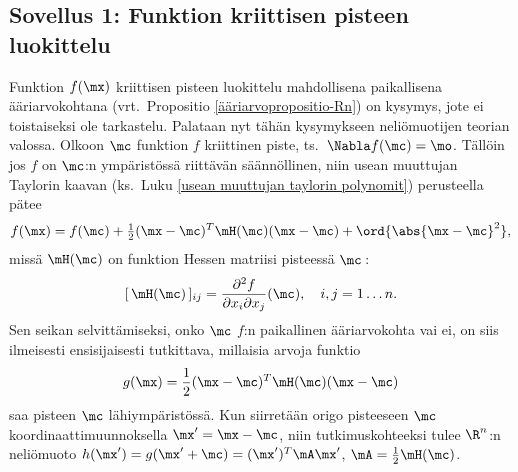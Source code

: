 \subsection{Sovellus 1: Funktion kriittisen pisteen luokittelu}

Funktion $f(\mx)$ kriittisen pisteen luokittelu mahdollisena paikallisena ääriarvokohtana
(vrt.\ Propositio \ref{ääriarvopropositio-Rn}) on kysymys, jote ei toistaiseksi ole tarkastelu.
Palataan nyt tähän kysymykseen neliömuotijen teorian valossa. Olkoon $\mc$ funktion $f$
kriittinen piste, ts.\ $\Nabla f(\mc)=\mo$. Tällöin jos $f$ on $\mc$:n ympäristössä riittävän
säännöllinen, niin usean muuttujan Taylorin kaavan (ks.\ Luku
\ref{usean muuttujan taylorin polynomit}) perusteella pätee
\[
f(\mx) = f(\mc)+\tfrac{1}{2}(\mx-\mc)^T\mH(\mc)(\mx-\mc)+\ord{\abs{\mx-\mc}^2},
\]
missä $\mH(\mc)$ on funktion Hessen matriisi pisteessä $\mc\,$:
\[
[\,\mH(\mc)\,]_{ij}=\frac{\partial^2 f}{\partial x_i\partial x_j}(\mc),\quad i,j=1\ldots n.
\]
Sen seikan selvittämiseksi, onko $\mc$ $f$:n paikallinen ääriarvokohta vai ei, on siis
ilmeisesti ensisijaisesti tutkittava, millaisia arvoja funktio
\[
g(\mx)=\frac{1}{2}(\mx-\mc)^T\mH(\mc)(\mx-\mc)
\]
saa pisteen $\mc$ lähiympäristössä. Kun siirretään origo pisteeseen $\mc$ 
koordinaattimuunnoksella $\mx'=\mx-\mc$, niin tutkimuskohteeksi tulee $\R^n$:n neliömuoto
$h(\mx')=g(\mx'+\mc) = (\mx')^T\mA\mx'$, $\mA=\frac{1}{2}\mH(\mc)$.

